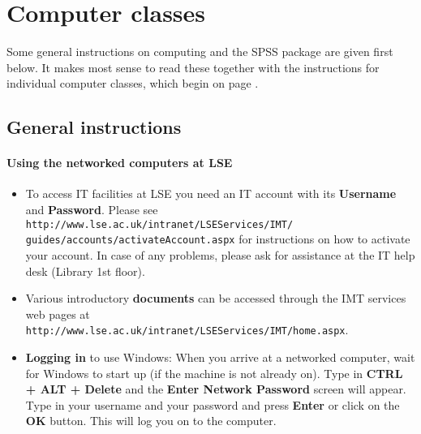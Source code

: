 \backmatter


\renewcommand{\chaptername}{}
\renewcommand{\thechapter}{}
\renewcommand{\thesection}{}
\renewcommand{\thesubsection}{}
\renewcommand{\chaptermark}[1]{\markboth{\MakeUppercase{#1}}{}}
\renewcommand{\sectionmark}[1]{\markright{\MakeUppercase{#1}}}
\renewcommand{\thetable}{A.\arabic{table}}

\chapter{Computer classes}
\label{c_class0}

\setcounter{section}{-1}

Some general instructions on computing and the SPSS package are given
first below. It makes most sense to read these together with the
instructions for individual computer classes, which begin on page
\pageref{p_class1}.

\section{General instructions}

\subsubsection{Using the networked computers at LSE}


\begin{itemize}
\item
To access IT facilities at LSE you need an IT account with its
\textbf{Username} and \textbf{Password}. Please see
\texttt{
http://www.lse.ac.uk/intranet/LSEServices/IMT/}\\\texttt{guides/accounts/activateAccount.aspx}
for instructions on how to activate your account. In case of any
problems, please ask for assistance at the IT help desk (Library 1st
floor).
\item
Various introductory \textbf{documents}
can be accessed through the IMT services web pages at
\texttt{http://www.lse.ac.uk/intranet/LSEServices/IMT/home.aspx}.
\item
\textbf{Logging in} to use Windows:
When you arrive at a networked computer, wait for Windows to start up
(if the machine is not already on). Type in \textbf{CTRL + ALT + Delete} and
the \textbf{Enter Network Password} screen will appear. Type in your
username and your password and press \textbf{Enter} or click on the
\textbf{OK} button. This will log you on to the computer.
\end{itemize}


